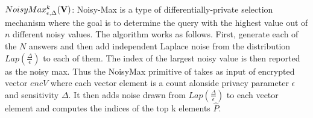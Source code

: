  $NoisyMax_{\epsilon,\Delta}^k(\mathbf{V})$:  Noisy-Max is a type of differentially-private selection mechanism \cite{Dork} where the goal is to determine the query with the highest value out of $n$ different noisy values. The algorithm works as follows. First, generate each of the $N$ answers and then add independent Laplace noise from the distribution $Lap(\frac{\Delta}{\epsilon})$ 
to each of them. The index of the largest noisy value is then reported as the noisy max. %
 Thus the \textsf{NoisyMax} primitive of \system takes as input of encrypted vector $encV$ where each vector element is a count alonside privacy parameter $\epsilon$ and sensitivity $\Delta$. It then adds noise drawn from $Lap(\frac{\Delta}{\epsilon})$ to each vector element and computes the indices of the top k elements $\hat{P}$.




